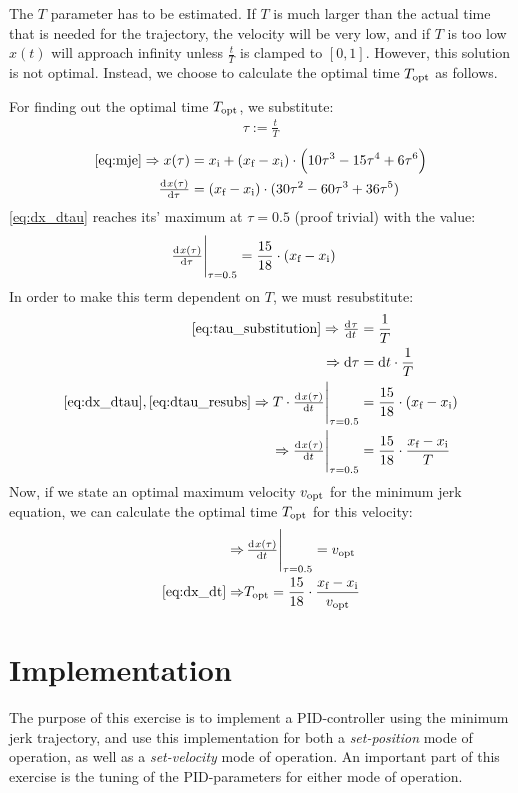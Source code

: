 \documentclass[11pt]{article}
\begin{document}
The $T$ parameter has to be estimated. If $T$ is much larger than  the actual time that is needed for the trajectory, the velocity will be very low, and if $T$ is too low $x(t)$ will approach infinity unless $\frac{t}{T}$ is clamped to $[0,1]$. However, this solution is not optimal. Instead, we choose to calculate the optimal time $T_\textup{opt}$ as follows.%
\par
For finding out the optimal time $T_\textup{opt}$, we substitute:
\begin{align}
  \label{eq:tau_substitution}
  \tau:=\frac{t}{T}
\end{align}
\begin{align}
\ref{eq:mje}\Rightarrow x(\tau)&= \di{x}{i} +  (\di{x}{f} - \di{x}{i}) \cdot \left(10\tau^3 - 15\tau^4 + 6\tau^6 \right)\\
\od{x(\tau)}{\tau}&= (\di{x}{f} - \di{x}{i})\cdot(30\tau^2-60\tau^3+36\tau^5)\label{eq:dx_dtau}
\end{align}
\ref{eq:dx_dtau} reaches its' maximum at $\tau=0.5$ (proof trivial) with the value:
\begin{align}
  \eval{\od{x(\tau)}{\tau}}_{\tau=0.5}&=\frac{15}{18}\cdot(\di{x}{f} - \di{x}{i})
\end{align}
In order to make this term dependent on $T$, we must resubstitute:
\begin{align}
  \ref{eq:tau_substitution}\Rightarrow \od{\tau}{t}&=\frac{1}{T}\\
  \Rightarrow\dif\tau&=\dif t\cdot\frac{1}{T}\label{eq:dtau_resubs}\\
  \ref{eq:dx_dtau},\ref{eq:dtau_resubs}\Rightarrow\eval{T\cdot\od{x(\tau)}{t}}_{\tau=0.5}&=\frac{15}{18}\cdot(\di{x}{f} - \di{x}{i})\\
  \Rightarrow\eval{\od{x(\tau)}{t}}_{\tau=0.5}&=\frac{15}{18}\cdot\frac{\di{x}{f} - \di{x}{i}}{T}\label{eq:dx_dt}
\end{align}
Now, if we state an optimal maximum velocity $v_\textup{opt}$ for the minimum jerk equation, we can calculate the optimal time $T_\textup{opt}$ for this velocity:
\begin{align}
  \Rightarrow&\eval{\od{x(\tau)}{t}}_{\tau=0.5}=\di{v}{opt}\\
  \ref{eq:dx_dt}\Rightarrow& \di{T}{opt}=\frac{15}{18}\cdot\frac{\di{x}{f} - \di{x}{i}}{\di{v}{opt}}
\end{align}
\par

\section{Implementation}
The purpose of this exercise is to implement a PID-controller using the minimum jerk trajectory, and use this implementation for both a \emph{set-position} mode of operation, as well as a \emph{set-velocity} mode of operation. An important part of this exercise is the tuning of the PID-parameters for either mode of operation. \par
\end{document}
